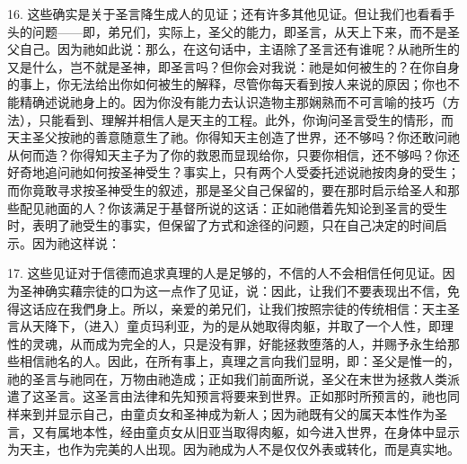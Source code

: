 16. 这些确实是关于圣言降生成人的见证；还有许多其他见证。但让我们也看看手头的问题——即，弟兄们，实际上，圣父的能力，即圣言，从天上下来，而不是圣父自己。因为祂如此说：那么，在这句话中，主语除了圣言还有谁呢？从祂所生的又是什么，岂不就是圣神，即圣言吗？但你会对我说：祂是如何被生的？在你自身的事上，你无法给出你如何被生的解释，尽管你每天看到按人来说的原因；你也不能精确述说祂身上的。因为你没有能力去认识造物主那娴熟而不可言喻的技巧（方法），只能看到、理解并相信人是天主的工程。此外，你询问圣言受生的情形，而天主圣父按祂的善意随意生了祂。你得知天主创造了世界，还不够吗？你还敢问祂从何而造？你得知天主子为了你的救恩而显现给你，只要你相信，还不够吗？你还好奇地追问祂如何按圣神受生？事实上，只有两个人受委托述说祂按肉身的受生；而你竟敢寻求按圣神受生的叙述，那是圣父自己保留的，要在那时启示给圣人和那些配见祂面的人？你该满足于基督所说的这话：正如祂借着先知论到圣言的受生时，表明了祂受生的事实，但保留了方式和途径的问题，只在自己决定的时间启示。因为祂这样说：\par

17. 这些见证对于信德而追求真理的人是足够的，不信的人不会相信任何见证。因为圣神确实藉宗徒的口为这一点作了见证，说：因此，让我们不要表现出不信，免得这话应在我們身上。所以，亲爱的弟兄们，让我们按照宗徒的传统相信：天主圣言从天降下，（进入）童贞玛利亚，为的是从她取得肉躯，并取了一个人性，即理性的灵魂，从而成为完全的人，只是没有罪，好能拯救堕落的人，并赐予永生给那些相信祂名的人。因此，在所有事上，真理之言向我们显明，即：圣父是惟一的，祂的圣言与祂同在，万物由祂造成；正如我们前面所说，圣父在末世为拯救人类派遣了这圣言。这圣言由法律和先知预言将要来到世界。正如那时所预言的，祂也同样来到并显示自己，由童贞女和圣神成为新人；因为祂既有父的属天本性作为圣言，又有属地本性，经由童贞女从旧亚当取得肉躯，如今进入世界，在身体中显示为天主，也作为完美的人出现。因为祂成为人不是仅仅外表或转化，而是真实地。\par

